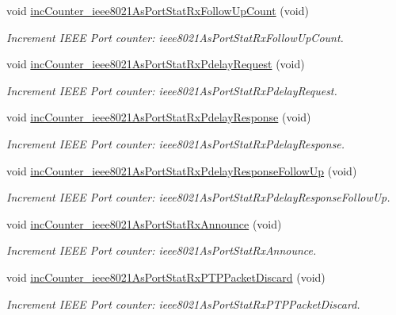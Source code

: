 \begin{DoxyCompactItemize}
void \hyperlink{class_common_port_acfa4a67632219499ba332b29dad2235c}{inc\+Counter\+\_\+ieee8021\+As\+Port\+Stat\+Rx\+Follow\+Up\+Count} (void)
\begin{DoxyCompactList}\small\item\em Increment I\+E\+EE Port counter\+: ieee8021\+As\+Port\+Stat\+Rx\+Follow\+Up\+Count. \end{DoxyCompactList}\item 
void \hyperlink{class_common_port_a3373adc8433a95b24a895472a6c89cff}{inc\+Counter\+\_\+ieee8021\+As\+Port\+Stat\+Rx\+Pdelay\+Request} (void)
\begin{DoxyCompactList}\small\item\em Increment I\+E\+EE Port counter\+: ieee8021\+As\+Port\+Stat\+Rx\+Pdelay\+Request. \end{DoxyCompactList}\item 
void \hyperlink{class_common_port_a6942efdfd632f8da83e8e5089f4a3ba1}{inc\+Counter\+\_\+ieee8021\+As\+Port\+Stat\+Rx\+Pdelay\+Response} (void)
\begin{DoxyCompactList}\small\item\em Increment I\+E\+EE Port counter\+: ieee8021\+As\+Port\+Stat\+Rx\+Pdelay\+Response. \end{DoxyCompactList}\item 
void \hyperlink{class_common_port_a616fe4534facbdb2d3e5296d5a787923}{inc\+Counter\+\_\+ieee8021\+As\+Port\+Stat\+Rx\+Pdelay\+Response\+Follow\+Up} (void)
\begin{DoxyCompactList}\small\item\em Increment I\+E\+EE Port counter\+: ieee8021\+As\+Port\+Stat\+Rx\+Pdelay\+Response\+Follow\+Up. \end{DoxyCompactList}\item 
void \hyperlink{class_common_port_ad2bd29a405395048ac98c1ad5f3b4d0f}{inc\+Counter\+\_\+ieee8021\+As\+Port\+Stat\+Rx\+Announce} (void)
\begin{DoxyCompactList}\small\item\em Increment I\+E\+EE Port counter\+: ieee8021\+As\+Port\+Stat\+Rx\+Announce. \end{DoxyCompactList}\item 
void \hyperlink{class_common_port_ab127287dc3c8d4bed5595b456ba4b17d}{inc\+Counter\+\_\+ieee8021\+As\+Port\+Stat\+Rx\+P\+T\+P\+Packet\+Discard} (void)
\begin{DoxyCompactList}\small\item\em Increment I\+E\+EE Port counter\+: ieee8021\+As\+Port\+Stat\+Rx\+P\+T\+P\+Packet\+Discard. \end{DoxyCompactList}\item 

\end{DoxyCompactItemize}
